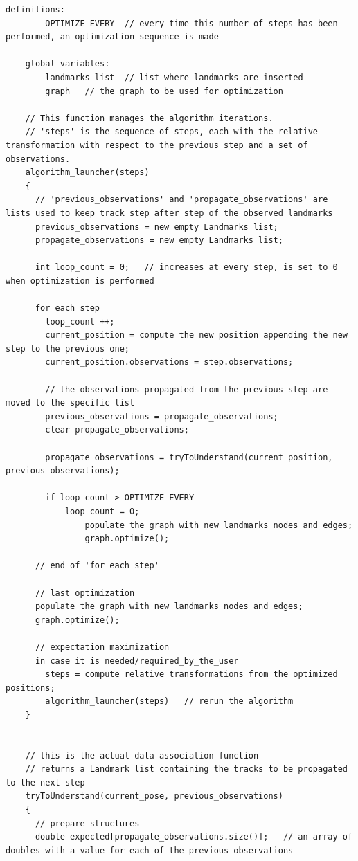 {\footnotesize
  \lstset{language=C}
  \begin{lstlisting}[frame=shadowbox,breaklines]
    definitions:
    	OPTIMIZE_EVERY	// every time this number of steps has been performed, an optimization sequence is made
    
    global variables: 
    	landmarks_list	// list where landmarks are inserted
        graph	// the graph to be used for optimization
        
    // This function manages the algorithm iterations.
    // 'steps' is the sequence of steps, each with the relative transformation with respect to the previous step and a set of observations.
    algorithm_launcher(steps)
    {
      // 'previous_observations' and 'propagate_observations' are lists used to keep track step after step of the observed landmarks
      previous_observations = new empty Landmarks list;
      propagate_observations = new empty Landmarks list;
      
      int loop_count = 0;	// increases at every step, is set to 0 when optimization is performed
      
      for each step
        loop_count ++;
      	current_position = compute the new position appending the new step to the previous one;
        current_position.observations = step.observations;
        
        // the observations propagated from the previous step are moved to the specific list
        previous_observations = propagate_observations;
        clear propagate_observations;
        
        propagate_observations = tryToUnderstand(current_position, previous_observations);
        
        if loop_count > OPTIMIZE_EVERY
        	loop_count = 0;
                populate the graph with new landmarks nodes and edges;
                graph.optimize();
        
      // end of 'for each step'
      
      // last optimization
      populate the graph with new landmarks nodes and edges;
      graph.optimize();
      
      // expectation maximization
      in case it is needed/required_by_the_user
      	steps = compute relative transformations from the optimized positions;
        algorithm_launcher(steps)	// rerun the algorithm
    }
    
    
    // this is the actual data association function
    // returns a Landmark list containing the tracks to be propagated to the next step
    tryToUnderstand(current_pose, previous_observations)
    {
      // prepare structures
      double expected[propagate_observations.size()];	// an array of doubles with a value for each of the previous observations
      

\end{lstlisting}}
